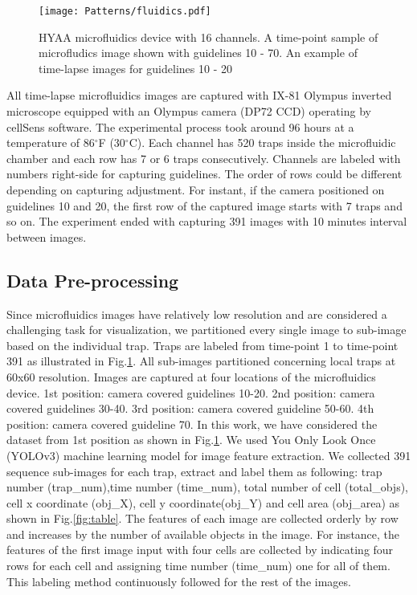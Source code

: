 \documentclass[conference]{IEEEtran}
\begin{document}
\begin{figure}
\centering
\texttt{[image: Patterns/fluidics.pdf]}
\caption{ HYAA microfluidics device with 16 channels. A time-point sample of microfludics image shown with guidelines 10 - 70. An  example of time-lapse images for guidelines 10 - 20  }
\label{fig:micro}
\end{figure}

All time-lapse microfluidics images are captured with IX-81 Olympus inverted microscope equipped with an Olympus camera (DP72 CCD) operating by cellSens software. The experimental process took around 96 hours at a temperature of 86$^{\circ}$F (30$^{\circ}$C). Each channel has 520 traps inside the microfluidic chamber and each row has 7 or 6 traps consecutively. Channels are labeled with numbers right-side for capturing guidelines. The order of rows could be different depending on capturing adjustment. For instant, if the camera positioned on guidelines 10 and 20, the first row of the captured image starts with 7 traps and so on. The experiment ended with capturing 391 images with 10 minutes interval between images. 

\subsection{Data Pre-processing}
Since microfluidics images have relatively low resolution and are considered a challenging task for visualization, we partitioned every single image to sub-image based on the individual trap. Traps are labeled from time-point 1 to time-point 391 as illustrated in Fig.\ref{fig:micro}. All sub-images partitioned concerning local traps at 60x60 resolution. Images are captured at four locations of the microfluidics device. 1st position: camera covered guidelines 10-20. 2nd position: camera covered guidelines 30-40. 3rd position: camera covered guideline 50-60. 4th position: camera covered guideline 70. In this work, we have considered the dataset from 1st position as shown in Fig.\ref{fig:micro}. We used You Only Look Once (YOLOv3) \cite{ref20} machine learning model for image feature extraction. We collected 391 sequence sub-images for each trap, extract and label them as following: trap number (trap\_num),time number (time\_num), total number of cell (total\_objs), cell x coordinate (obj\_X), cell y coordinate(obj\_Y) and cell area (obj\_area) as shown in Fig.\ref{fig:table}. The features of each image are collected orderly by row and increases by the number of available objects in the image. For instance, the features of the first image input with four cells are collected by indicating four rows for each cell and assigning time number (time\_num) one for all of them. This labeling method continuously followed for the rest of the images.
\end{document}

